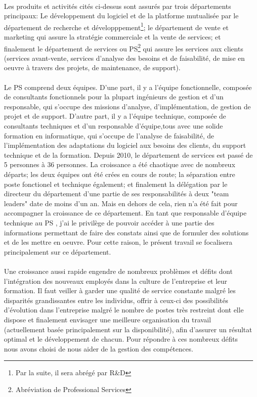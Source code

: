 \paragraph{}Les produits et activités cités ci-dessus sont assurés par trois départements principaux: Le développement du logiciel et de la platforme mutualisée par le département de recherche et développpement\footnote{Par la suite, il sera abrégé par R\&D}; le département de vente et marketing qui assure la stratégie commerciale et la vente de services; et finalement le département de services ou PS\footnote{Abréviation de Professional Services} qui assure les services aux clients (services avant-vente, services d’analyse des besoins et de faisabilité, de mise en oeuvre à travers des projets, de maintenance, de support). 

\paragraph{}Le PS comprend deux équipes. D'une part, il y a l'équipe fonctionnelle, composée de consultants fonctionnels pour la plupart ingénieurs de gestion et d'un responsable, qui s'occupe des missions d'analyse, d'implémentation, de gestion de projet et de support. D'autre part, il y a l'équipe technique, composée de consultants techniques et d'un responsable d'équipe,tous avec une solide formation en informatique, qui s'occupe de l'analyse de faisabilité, de l'implémentation des adaptations du logiciel aux besoins des clients, du support technique et de la formation. Depuis 2010, le département de services est passé de 5 personnes à 36 personnes. La croissance a été chaotique avec de nombreux départs; les deux équipes ont été crées en cours de route; la séparation entre poste fonctionel et technique également; et finalement la délégation par le directeur du département d'une partie de ses responsabilités à deux "team leaders" date de moins d'un an. Mais en dehors de cela, rien n'a été fait pour accompagner la croissance de ce département. En tant que responsable d’équipe technique au PS , j’ai le privilège de pouvoir accéder à une partie des informations permettant de faire des constats ainsi que de formuler des solutions et de les mettre en oeuvre. Pour cette raison, le présent travail se focalisera principalement sur ce département.


\paragraph*{}Une croissance aussi rapide engendre de nombreux problèmes et défits dont l'intégration des nouveaux employés dans la culture de l'entreprise et leur formation. Il faut veiller à garder une qualité de service constante malgré les disparités grandissantes entre les individus, offrir à ceux-ci des possibilités d'évolution dans l'entreprise malgré le nombre de postes très restreint dont elle dispose et finalement envisager une meilleure organisation du travail (actuellement basée principalement sur la disponibilité), afin d'assurer un résultat optimal et le développement de chacun. Pour répondre à ces nombreux défits nous avons choisi de nous aider de la gestion des compétences.

